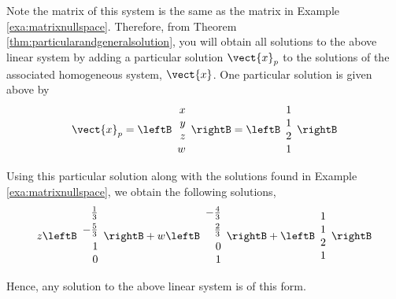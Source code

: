 \begin{solution} Note the matrix of this system is the same as the matrix in Example 
\ref{exa:matrixnullspace}. Therefore, from Theorem \ref{thm:particularandgeneralsolution}, you will obtain all
solutions to the above linear system by adding a particular solution $\vect{x}_p$ to the solutions of the associated homogeneous 
system, $\vect{x}$. One particular solution is given above by
\begin{equation}
\vect{x}_p
=
\leftB
\begin{array}{r}
x \\
y \\
z \\
w
\end{array}
\rightB=\leftB
\begin{array}{r}
1 \\
1 \\
2 \\
1
\end{array}
\rightB
\end{equation}

Using this particular solution along with the solutions found in Example \ref{exa:matrixnullspace}, we
obtain the following solutions, 
\begin{equation*}
z\leftB
\begin{array}{r}
\vspace{0.05in}\frac{1}{3} \\
-\vspace{0.05in}\frac{5}{3} \\
1 \\
0
\end{array}
\rightB +w\leftB
\begin{array}{r}
-\vspace{0.05in}\frac{4}{3} \\
\vspace{0.05in}\frac{2}{3} \\
0 \\
1
\end{array}
\rightB +\leftB
\begin{array}{r}
1 \\
1 \\
2 \\
1
\end{array}
\rightB 
\end{equation*}

Hence, any solution to the above linear system is of this form.
\end{solution} 
